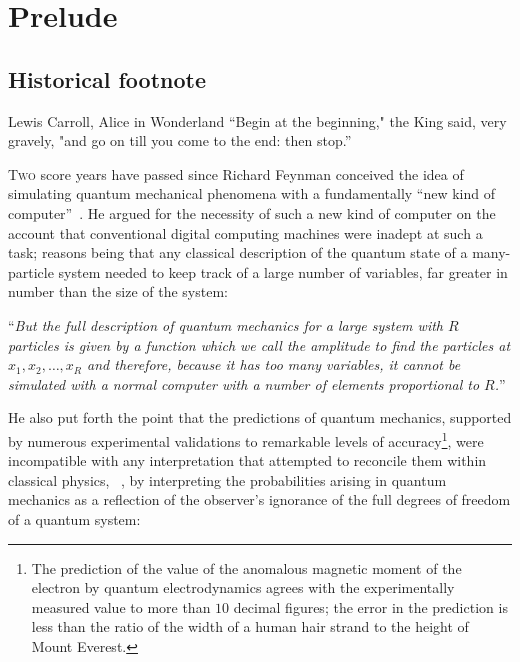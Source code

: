 {}

\chapter{Prelude}

\section{Historical footnote}

\begin{epigram}{Lewis Carroll, Alice in Wonderland}
    \enquote{Begin at the beginning," the King said, very gravely, "and go on till you come to the end: then stop.} 
\end{epigram}

\lettrine[lines=3]{T}{wo} score years have passed since Richard Feynman conceived the idea of simulating quantum mechanical phenomena with a fundamentally \enquote{new kind of computer}~\cite{Feynman_1982}. He argued for the necessity of such a new kind of computer on the account that conventional digital computing machines were inadept at such a task; reasons being that any classical description of the quantum state of a many-particle system needed to keep track of a large number of variables, far greater in number than the size of the system:

\begin{displayquote}
	\enquote{\emph{But the full description of quantum mechanics for a large system with $R$ particles is given by a function which we call the amplitude to find the particles at $x_1, x_2, \ldots ,x_R$ and therefore, because it has too many variables, it cannot be simulated with a normal computer with a number of elements proportional to $R$.}}
\end{displayquote}

\noindent
He also put forth the point that the predictions of quantum mechanics, supported by numerous experimental validations to remarkable levels of accuracy\footnote{The prediction of the value of the anomalous magnetic moment of the electron by quantum electrodynamics agrees with the experimentally measured value to more than $10$ decimal figures; \ie the error in the prediction is less than the ratio of the width of a human hair strand to the height of Mount Everest.}, were incompatible with any interpretation that attempted to reconcile them within classical physics, ~\ie, by interpreting the probabilities arising in quantum mechanics as a reflection of the observer's ignorance of the full degrees of freedom of a quantum system:

